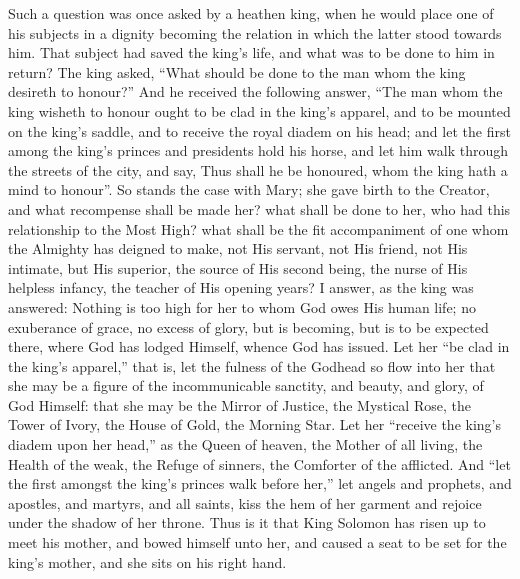 Such a question was once asked by a heathen king, when he would
place one of his subjects in a dignity becoming the relation in which
the latter stood towards him. That subject had saved the king's life,
and what was to be done to him in return? The king asked, ``What should
be done to the man whom the king desireth to honour?'' And he
received the following answer, ``The man whom the king wisheth to
honour ought to be clad in the king's apparel, and to be mounted on
the king's saddle, and to receive the royal diadem on his head; and
let the first among the king's princes and presidents hold his horse,
and let him walk through the streets of the city, and say, Thus shall
he be honoured, whom the king hath a mind to honour''. So stands
the case with Mary; she gave birth to the Creator, and what recompense
shall be made her? what shall be done to her, who had this
relationship to the Most High? what shall be the fit accompaniment of
one whom the Almighty has deigned to make, not His servant, not His
friend, not His intimate, but His superior, the source of His second
being, the nurse of His helpless infancy, the teacher of His opening
years? I answer, as the king was answered: Nothing is too high for her
to whom God owes His human life; no exuberance of grace, no excess of
glory, but is becoming, but is to be expected there, where God has
lodged Himself, whence God has issued. Let her ``be clad in the
king's apparel,'' that is, let the fulness of the Godhead so flow
into her that she may be a figure of the incommunicable sanctity, and
beauty, and glory, of God Himself: that she may be the Mirror of
Justice, the Mystical Rose, the Tower of Ivory, the House of Gold, the
Morning Star. Let her ``receive the king's diadem upon her
head,'' as the Queen of heaven, the Mother of all living, the
Health of the weak, the Refuge of sinners, the Comforter of the
afflicted. And ``let the first amongst the king's princes walk
before her,'' let angels and prophets, and apostles, and martyrs,
and all saints, kiss the hem of her garment and rejoice under the
shadow of her throne. Thus is it that King Solomon has risen up to
meet his mother, and bowed himself unto her, and caused a seat to be
set for the king's mother, and she sits on his right hand.

